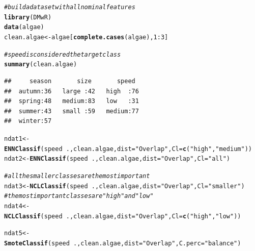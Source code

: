\documentclass[10pt,a4paper]{article}\usepackage[]{graphicx}\usepackage[]{color}
\makeatletter
\newcommand{\hlnum}[1]{\textcolor[rgb]{0.686,0.059,0.569}{#1}}%
\newcommand{\hlstr}[1]{\textcolor[rgb]{0.192,0.494,0.8}{#1}}%
\newcommand{\hlcom}[1]{\textcolor[rgb]{0.678,0.584,0.686}{\textit{#1}}}%
\newcommand{\hlopt}[1]{\textcolor[rgb]{0,0,0}{#1}}%
\newcommand{\hlstd}[1]{\textcolor[rgb]{0.345,0.345,0.345}{#1}}%
\newcommand{\hlkwb}[1]{\textcolor[rgb]{0.69,0.353,0.396}{#1}}%
\newcommand{\hlkwc}[1]{\textcolor[rgb]{0.333,0.667,0.333}{#1}}%
\newcommand{\hlkwd}[1]{\textcolor[rgb]{0.737,0.353,0.396}{\textbf{#1}}}%
\newenvironment{kframe}{%
 \def\at@end@of@kframe{}%
 \ifinner\ifhmode%
  \def\at@end@of@kframe{\end{minipage}}%
  \begin{minipage}{\columnwidth}%
 \fi\fi%
 \def\FrameCommand##1{\hskip\@totalleftmargin \hskip-\fboxsep
 \colorbox{shadecolor}{##1}\hskip-\fboxsep
     \hskip-\linewidth \hskip-\@totalleftmargin \hskip\columnwidth}%
 \MakeFramed {\advance\hsize-\width
   \@totalleftmargin\z@ \linewidth\hsize
   \@setminipage}}%
 {\par\unskip\endMakeFramed%
 \at@end@of@kframe}
\newenvironment{knitrout}{}{} %
\makeatother
\begin{document}
\begin{knitrout}\footnotesize
{}\color{fgcolor}\begin{kframe}
\begin{alltt}
\hlcom{# build a data set with all nominal features}
\hlkwd{library}\hlstd{(DMwR)}
\hlkwd{data}\hlstd{(algae)}
\hlstd{clean.algae} \hlkwb{<-} \hlstd{algae[}\hlkwd{complete.cases}\hlstd{(algae),}\hlnum{1}\hlopt{:}\hlnum{3}\hlstd{]}

\hlcom{# speed is considered the target class}
\hlkwd{summary}\hlstd{(clean.algae)}
\end{alltt}
\begin{verbatim}
##     season       size       speed   
##  autumn:36   large :42   high  :76  
##  spring:48   medium:83   low   :31  
##  summer:43   small :59   medium:77  
##  winter:57
\end{verbatim}
\begin{alltt}
\hlstd{ndat1} \hlkwb{<-} \hlkwd{ENNClassif}\hlstd{(speed}\hlopt{~}\hlstd{., clean.algae,} \hlkwc{dist}\hlstd{=}\hlstr{"Overlap"}\hlstd{,}  \hlkwc{Cl}\hlstd{=}\hlkwd{c}\hlstd{(}\hlstr{"high"}\hlstd{,} \hlstr{"medium"}\hlstd{))}
\hlstd{ndat2} \hlkwb{<-} \hlkwd{ENNClassif}\hlstd{(speed}\hlopt{~}\hlstd{., clean.algae,} \hlkwc{dist}\hlstd{=}\hlstr{"Overlap"}\hlstd{,}  \hlkwc{Cl}\hlstd{=}\hlstr{"all"}\hlstd{)}

\hlcom{#all the smaller classes are the most important}
\hlstd{ndat3} \hlkwb{<-} \hlkwd{NCLClassif}\hlstd{(speed}\hlopt{~}\hlstd{., clean.algae,} \hlkwc{dist}\hlstd{=}\hlstr{"Overlap"}\hlstd{,}  \hlkwc{Cl}\hlstd{=}\hlstr{"smaller"}\hlstd{)}
\hlcom{# the most important classes are "high" and "low"}
\hlstd{ndat4} \hlkwb{<-} \hlkwd{NCLClassif}\hlstd{(speed}\hlopt{~}\hlstd{., clean.algae,} \hlkwc{dist}\hlstd{=}\hlstr{"Overlap"}\hlstd{,}  \hlkwc{Cl}\hlstd{=}\hlkwd{c}\hlstd{(}\hlstr{"high"}\hlstd{,} \hlstr{"low"}\hlstd{))}

\hlstd{ndat5} \hlkwb{<-} \hlkwd{SmoteClassif}\hlstd{(speed}\hlopt{~}\hlstd{., clean.algae,} \hlkwc{dist}\hlstd{=}\hlstr{"Overlap"}\hlstd{,} \hlkwc{C.perc}\hlstd{=}\hlstr{"balance"}\hlstd{)}
\end{alltt}
\end{kframe}
\end{knitrout}
\end{document}
